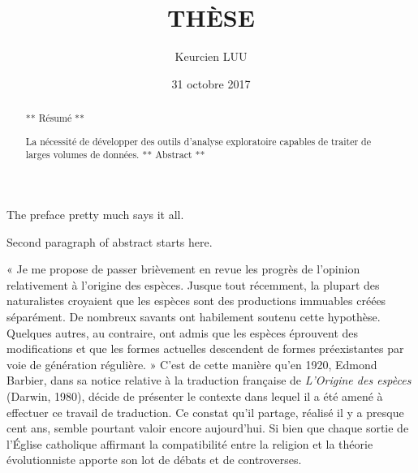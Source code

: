 \documentclass[12pt,twoside]{ugathesis}
\title{THÈSE}
\author{Keurcien LUU}
\date{31 octobre 2017}
\begin{document}
      \maketitle
  
  \frontmatter %
  \pagestyle{empty} %
      \begin{acknowledgements}
      The preface pretty much says it all. \par  Second paragraph of abstract
      starts here.
    \end{acknowledgements}
      \begin{preface}
      « Je me propose de passer brièvement en revue les progrès de l'opinion
      relativement à l'origine des espèces. Jusque tout récemment, la plupart
      des naturalistes croyaient que les espèces sont des productions
      immuables créées séparément. De nombreux savants ont habilement soutenu
      cette hypothèse. Quelques autres, au contraire, ont admis que les
      espèces éprouvent des modifications et que les formes actuelles
      descendent de formes préexistantes par voie de génération régulière. »
      C'est de cette manière qu'en 1920, Edmond Barbier, dans sa notice
      relative à la traduction française de \textit{L'Origine des espèces}
      (Darwin, 1980), décide de présenter le contexte dans lequel il a été
      amené à effectuer ce travail de traduction. Ce constat qu'il partage,
      réalisé il y a presque cent ans, semble pourtant valoir encore
      aujourd'hui. Si bien que chaque sortie de l'Église catholique affirmant
      la compatibilité entre la religion et la théorie évolutionniste apporte
      son lot de débats et de controverses. \par
    \end{preface}
      \hypersetup{linkcolor=black}
    \setcounter{tocdepth}{2}
    \tableofcontents
  
      \listoftables
  
      \listoffigures
      \begin{abstract}
      ** Résumé ** \par  La nécessité de développer des outils d'analyse
      exploratoire capables de traiter de larges volumes de données. **
      Abstract **
    \end{abstract}
  
  \mainmatter %
  \pagestyle{fancyplain} %
\end{document}
